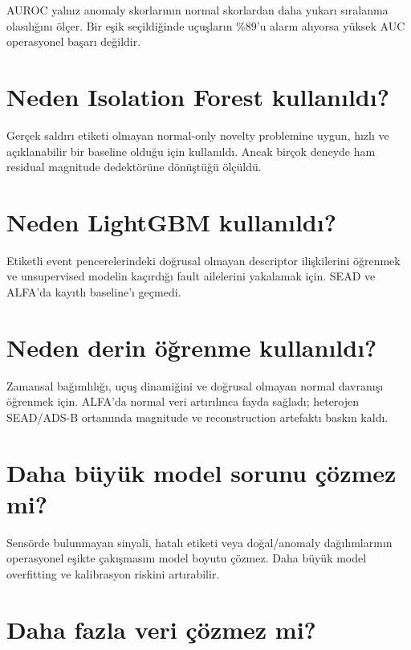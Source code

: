 \documentclass[11pt,a4paper,oneside]{report}
\begin{document}
AUROC yalnız anomaly skorlarının normal skorlardan daha yukarı sıralanma
olasılığını ölçer. Bir eşik seçildiğinde uçuşların \(\%89\)'u alarm alıyorsa
yüksek AUC operasyonel başarı değildir.

\section*{Neden Isolation Forest kullanıldı?}

Gerçek saldırı etiketi olmayan normal-only novelty problemine uygun, hızlı
ve açıklanabilir bir baseline olduğu için kullanıldı. Ancak birçok deneyde
ham residual magnitude dedektörüne dönüştüğü ölçüldü.

\section*{Neden LightGBM kullanıldı?}

Etiketli event pencerelerindeki doğrusal olmayan descriptor ilişkilerini
öğrenmek ve unsupervised modelin kaçırdığı fault ailelerini yakalamak için.
SEAD ve ALFA'da kayıtlı baseline'ı geçmedi.

\section*{Neden derin öğrenme kullanıldı?}

Zamansal bağımlılığı, uçuş dinamiğini ve doğrusal olmayan normal davranışı
öğrenmek için. ALFA'da normal veri artırılınca fayda sağladı; heterojen
SEAD/ADS-B ortamında magnitude ve reconstruction artefaktı baskın kaldı.

\section*{Daha büyük model sorunu çözmez mi?}

Sensörde bulunmayan sinyali, hatalı etiketi veya doğal/anomaly dağılımlarının
operasyonel eşikte çakışmasını model boyutu çözmez. Daha büyük model
overfitting ve kalibrasyon riskini artırabilir.

\section*{Daha fazla veri çözmez mi?}
\end{document}
